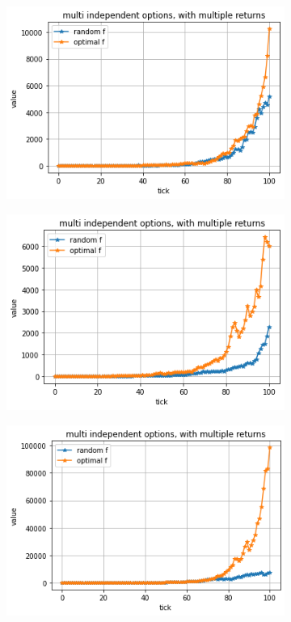 \documentclass{article}
\begin{document}
	\begin{figure}[!h]
	\begin{subfigure}{0.525\textwidth}
		\includegraphics[width=0.9\linewidth]{multi2-1} 
	\end{subfigure}
	\begin{subfigure}{0.525\textwidth}
		\includegraphics[width=0.9\linewidth]{multi2-2}
	\end{subfigure}
	\begin{subfigure}{0.525\textwidth}
		\includegraphics[width=0.9\linewidth]{multi2-3}

\end{subfigure}
\end{figure}
\end{document}
